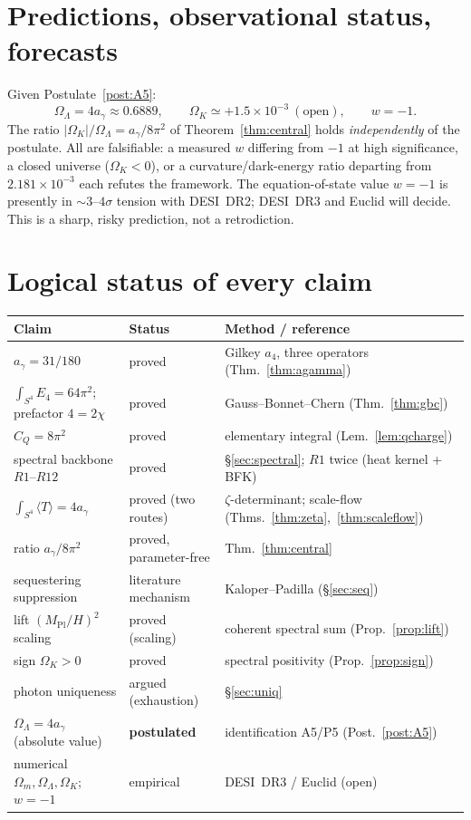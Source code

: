 \documentclass[11pt,a4paper]{article}
\theoremstyle{definition}
\theoremstyle{remark}
\newcommand{\ag}{a_\gamma}
\newcommand{\CQ}{C_Q}
\newcommand{\Ok}{\Omega_K}
\newcommand{\OL}{\Omega_\Lambda}
\newcommand{\Om}{\Omega_m}
\newcommand{\Mpl}{M_{\mathrm{Pl}}}
\newcommand{\avg}[1]{\langle #1\rangle}
\begin{document}
\section{Predictions, observational status, forecasts}\label{sec:obs}
Given Postulate~\ref{post:A5}:
\[
\OL=4\ag\approx0.6889,\qquad \Ok\simeq+1.5\times10^{-3}\ (\text{open}),\qquad w=-1 .
\]
The ratio $\lvert\Ok\rvert/\OL=\ag/8\pi^2$ of Theorem~\ref{thm:central} holds \emph{independently}
of the postulate. All are falsifiable: a measured $w$ differing from $-1$ at high significance, a
closed universe ($\Ok<0$), or a curvature/dark-energy ratio departing from $2.181\times10^{-3}$
each refutes the framework. The equation-of-state value $w=-1$ is presently in $\sim3$--$4\sigma$
tension with DESI~DR2; DESI~DR3 and Euclid will decide. This is a sharp, risky prediction, not a
retrodiction.

\section{Logical status of every claim}\label{sec:ledger}
\begin{center}
\begin{tabular}{lll}
\toprule
Claim & Status & Method / reference \\
\midrule
$\ag=31/180$ & proved & Gilkey $a_4$, three operators (Thm.~\ref{thm:agamma}) \\
$\int_{S^4}E_4=64\pi^2$; prefactor $4=2\chi$ & proved & Gauss--Bonnet--Chern (Thm.~\ref{thm:gbc}) \\
$\CQ=8\pi^2$ & proved & elementary integral (Lem.~\ref{lem:qcharge}) \\
spectral backbone $R1$--$R12$ & proved & \S\ref{sec:spectral}; $R1$ twice (heat kernel + BFK) \\
$\int_{S^4}\avg T=4\ag$ & proved (two routes) & $\zeta$-determinant; scale-flow (Thms.~\ref{thm:zeta},~\ref{thm:scaleflow}) \\
ratio $\ag/8\pi^2$ & proved, parameter-free & Thm.~\ref{thm:central} \\
sequestering suppression & literature mechanism & Kaloper--Padilla (\S\ref{sec:seq}) \\
lift $(\Mpl/H)^2$ scaling & proved (scaling) & coherent spectral sum (Prop.~\ref{prop:lift}) \\
sign $\Ok>0$ & proved & spectral positivity (Prop.~\ref{prop:sign}) \\
photon uniqueness & argued (exhaustion) & \S\ref{sec:uniq} \\
$\OL=4\ag$ (absolute value) & \textbf{postulated} & identification A5/P5 (Post.~\ref{post:A5}) \\
numerical $\Om,\OL,\Ok$; $w=-1$ & empirical & DESI~DR3 / Euclid (open) \\
\bottomrule
\end{tabular}
\end{center}
\end{document}
